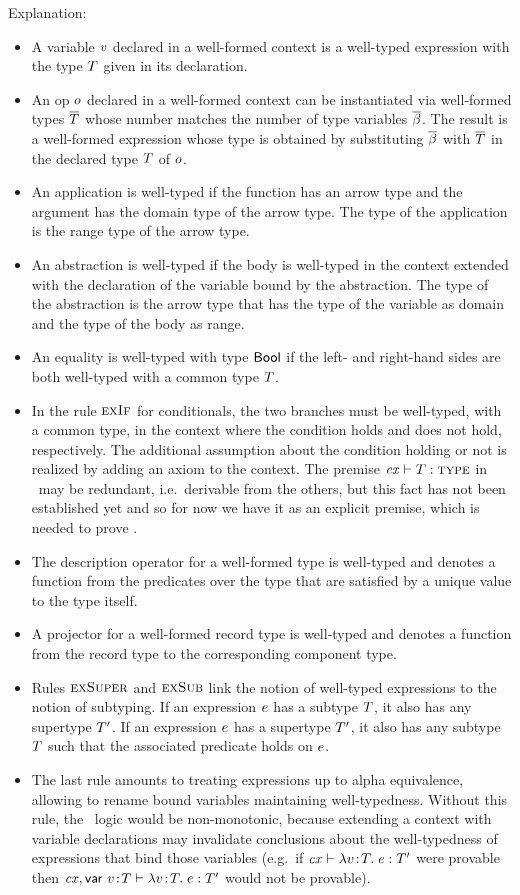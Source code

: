 Explanation:
\begin{itemize}
\item
A variable $v$ declared in a well-formed context is a well-typed expression
with the type $T$ given in its declaration.
\item
An op $o$ declared in a well-formed context can be instantiated via
well-formed types $\overline{T}$ whose number matches the number of type variables
$\overline{\beta}$. The result is a well-formed expression whose type is obtained by
substituting $\overline{\beta}$ with $\overline{T}$ in the declared type $T$ of $o$.
\item
An application is well-typed if the function has an arrow type and the argument
has the domain type of the arrow type. The type of the application is the range
type of the arrow type.
\item
An abstraction is well-typed if the body is well-typed in the context extended
with the declaration of the variable bound by the abstraction. The type of the
abstraction is the arrow type that has the type of the variable as domain and
the type of the body as range.
\item
An equality is well-typed with type $\mathsf{Bool}$ if the left- and right-hand sides
are both well-typed with a common type $T$.
\item
In the rule $\textsc{exIf}$ for conditionals, the two branches must be well-typed, with
a common type, in the context where the condition holds and does not hold,
respectively. The additional assumption about the condition holding or not is
realized by adding an axiom to the context. The premise $\mathit{cx}\vdash T:\textsc{type}$ in \Reif\
may be redundant, i.e.\ derivable from the others, but this fact has not been
established yet and so for now we have it as an explicit premise, which is
needed to prove \thmref{thm-exty-wf}.
\item
The description operator for a well-formed type is well-typed and denotes a
function from the predicates over the type that are satisfied by a unique value
to the type itself.
\item
A projector for a well-formed record type is well-typed and denotes a function
from the record type to the corresponding component type.
\item
Rules $\textsc{exSuper}$ and $\textsc{exSub}$ link the notion of well-typed expressions to the
notion of subtyping. If an expression $e$ has a subtype $T$, it also has
any supertype $T'$. If an expression $e$ has a supertype $T'$, it also
has any subtype $T$ such that the associated predicate holds on $e$.
\item
The last rule amounts to treating expressions up to alpha equivalence, allowing
to rename bound variables maintaining well-typedness. Without this rule, the
\MS\ logic would be non-monotonic, because extending a context with variable
declarations may invalidate conclusions about the well-typedness of expressions
that bind those variables (e.g.\ if $\mathit{cx}\vdash\lambda v\!:\!T.\;e:T'$ were provable then
$\mathit{cx},\mathsf{var}\ v\!:\!T\vdash\lambda v\!:\!T.\;e:T'$ would not be provable).
\end{itemize}

